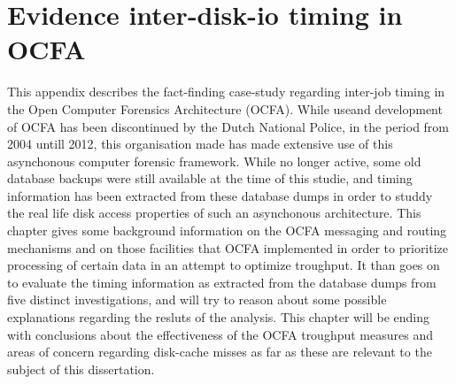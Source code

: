 \chapter{Evidence inter-disk-io timing in OCFA}
This appendix describes the fact-finding case-study regarding inter-job timing in the Open Computer Forensics Architecture (OCFA). While useand development of OCFA has been discontinued by the Dutch National Police, in the period from 2004 untill 2012, this organisation made has made extensive use of this asynchonous computer forensic framework. While no longer active, some old database backups were still available at the time of this studie, and timing information has been extracted from these database dumps in order to studdy the real life disk access properties of such an asynchonous architecture. This chapter gives some background information on the OCFA messaging and routing mechanisms and on those facilities that OCFA implemented in order to prioritize processing of certain data in an attempt to optimize troughput. It than goes on to evaluate the timing information as extracted from the database dumps from five distinct investigations, and will try to reason about some possible explanations regarding the resluts of the analysis. This chapter will be ending with conclusions about the effectiveness of the OCFA troughput measures and areas of concern regarding disk-cache misses as far as these are relevant to the subject of this dissertation.
